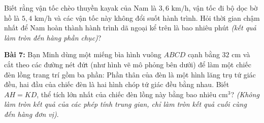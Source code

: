 \documentclass[12pt]{article}
\begin{document}
	Biết rằng vận tốc chèo thuyền kayak của Nam là $3{,}6\text{ km/h}$, vận tốc đi bộ dọc bờ hồ là $5{,}4\text{ km/h}$ và các vận tốc này không đổi suốt hành trình. Hỏi thời gian chậm nhất để Nam hoàn thành hành trình dã ngoại kể trên là bao nhiêu phút \textit{(kết quả làm tròn đến hàng phần chục)}?
	
	\vspace*{0.6cm}
	\noindent \textbf{Bài 7:} Bạn Minh dùng một miếng bìa hình vuông $ABCD$ cạnh bằng $32\text{ cm}$ và cắt theo các đường nét đứt (như hình vẽ mô phỏng bên dưới) để làm một chiếc đèn lồng trang trí gồm ba phần: Phần thân của đèn là một hình lăng trụ tứ giác đều, hai đầu của chiếc đèn là hai hình chóp tứ giác đều bằng nhau. Biết $AH = KD$, thể tích lớn nhất của chiếc đèn lồng này bằng bao nhiêu $\text{cm}^3$? \textit{(Không làm tròn kết quả của các phép tính trung gian, chỉ làm tròn kết quả cuối cùng đến hàng đơn vị)}.
	
\end{document}
